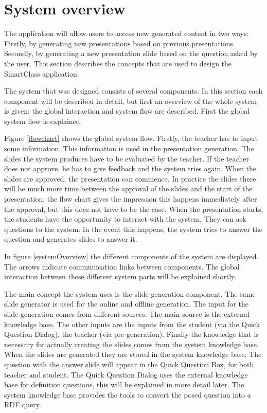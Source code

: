 \documentclass[11pt]{article}
\begin{document}
\section{System overview}
The application will allow users to access new generated content in two ways: Firstly, by generating new presentations based on previous presentations. Secondly, by generating a new presentation slide based on the question asked by the user. This section describes the concepts that are used to design the SmartClass application.

The system that was designed consists of several components. In this section each component will be described in detail, but first an overview of the whole system is given: the global interaction and system flow are described. First the global system flow is explained.

Figure \ref{flowchart} shows the global system flow. Firstly, the teacher has to input some information. This information is used in the presentation generation. The slides the system produces have to be evaluated by the teacher. If the teacher does not approve, he has to give feedback and the system tries again.
When the slides are approved, the presentation can commence. In practice the slides there will be much more time between the approval of the slides and the start of the presentation; the flow chart gives the impression this happens immediately after the approval, but this does not have to be the case.
When the presentation starts, the students have the opportunity to interact with the system. They can ask questions to the system. In the event this happens, the system tries to answer the question and generates slides to answer it.

In figure \ref{systemOverview} the different components of the system are displayed. The arrows indicate communication links between components. The global interaction between these different system parts will be explained shortly. 

The main concept the system uses is the slide generation component. The same slide generator is used for the online and offline generation. The input for the slide generation comes from different sources. The main source is the external knowledge base. The other inputs are the inputs from the student (via the Quick Question Dialog), the teacher (via pre-generation). Finally the knowledge that is necessary for actually creating the slides comes from the system knowledge base.
When the slides are generated they are stored in the system knowledge base. The question with the answer slide will appear in the Quick Question Box, for both teacher and student.
The Quick Question Dialog uses the external knowledge base for definition questions, this will be explained in more detail later. The system knowledge base provides the tools to convert the posed question into a RDF query.
\end{document}
